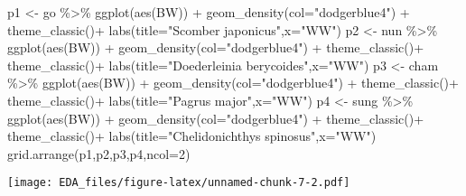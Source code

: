 \documentclass[
]{article}
\newenvironment{Shaded}{\begin{snugshade}}{\end{snugshade}}
\newcommand{\AttributeTok}[1]{\textcolor[rgb]{0.77,0.63,0.00}{#1}}
\newcommand{\DecValTok}[1]{\textcolor[rgb]{0.00,0.00,0.81}{#1}}
\newcommand{\FunctionTok}[1]{\textcolor[rgb]{0.00,0.00,0.00}{#1}}
\newcommand{\NormalTok}[1]{#1}
\newcommand{\OtherTok}[1]{\textcolor[rgb]{0.56,0.35,0.01}{#1}}
\newcommand{\SpecialCharTok}[1]{\textcolor[rgb]{0.00,0.00,0.00}{#1}}
\newcommand{\StringTok}[1]{\textcolor[rgb]{0.31,0.60,0.02}{#1}}
\begin{document}
\begin{Shaded}
\begin{Highlighting}[]
\NormalTok{p1 }\OtherTok{\textless{}{-}}\NormalTok{ go }\SpecialCharTok{\%\textgreater{}\%} \FunctionTok{ggplot}\NormalTok{(}\FunctionTok{aes}\NormalTok{(BW)) }\SpecialCharTok{+} \FunctionTok{geom\_density}\NormalTok{(}\AttributeTok{col=}\StringTok{"dodgerblue4"}\NormalTok{) }\SpecialCharTok{+} \FunctionTok{theme\_classic}\NormalTok{()}\SpecialCharTok{+} \FunctionTok{labs}\NormalTok{(}\AttributeTok{title=}\StringTok{"Scomber japonicus"}\NormalTok{,}\AttributeTok{x=}\StringTok{"WW"}\NormalTok{)}
\NormalTok{p2 }\OtherTok{\textless{}{-}}\NormalTok{ nun }\SpecialCharTok{\%\textgreater{}\%} \FunctionTok{ggplot}\NormalTok{(}\FunctionTok{aes}\NormalTok{(BW)) }\SpecialCharTok{+} \FunctionTok{geom\_density}\NormalTok{(}\AttributeTok{col=}\StringTok{"dodgerblue4"}\NormalTok{) }\SpecialCharTok{+} \FunctionTok{theme\_classic}\NormalTok{()}\SpecialCharTok{+} \FunctionTok{theme\_classic}\NormalTok{()}\SpecialCharTok{+} \FunctionTok{labs}\NormalTok{(}\AttributeTok{title=}\StringTok{"Doederleinia berycoides"}\NormalTok{,}\AttributeTok{x=}\StringTok{"WW"}\NormalTok{)}
\NormalTok{p3 }\OtherTok{\textless{}{-}}\NormalTok{ cham }\SpecialCharTok{\%\textgreater{}\%} \FunctionTok{ggplot}\NormalTok{(}\FunctionTok{aes}\NormalTok{(BW)) }\SpecialCharTok{+} \FunctionTok{geom\_density}\NormalTok{(}\AttributeTok{col=}\StringTok{"dodgerblue4"}\NormalTok{) }\SpecialCharTok{+} \FunctionTok{theme\_classic}\NormalTok{()}\SpecialCharTok{+} \FunctionTok{theme\_classic}\NormalTok{()}\SpecialCharTok{+} \FunctionTok{labs}\NormalTok{(}\AttributeTok{title=}\StringTok{"Pagrus major"}\NormalTok{,}\AttributeTok{x=}\StringTok{"WW"}\NormalTok{)}
\NormalTok{p4 }\OtherTok{\textless{}{-}}\NormalTok{ sung }\SpecialCharTok{\%\textgreater{}\%} \FunctionTok{ggplot}\NormalTok{(}\FunctionTok{aes}\NormalTok{(BW)) }\SpecialCharTok{+} \FunctionTok{geom\_density}\NormalTok{(}\AttributeTok{col=}\StringTok{"dodgerblue4"}\NormalTok{) }\SpecialCharTok{+} \FunctionTok{theme\_classic}\NormalTok{()}\SpecialCharTok{+} \FunctionTok{theme\_classic}\NormalTok{()}\SpecialCharTok{+} \FunctionTok{labs}\NormalTok{(}\AttributeTok{title=}\StringTok{"Chelidonichthys spinosus"}\NormalTok{,}\AttributeTok{x=}\StringTok{"WW"}\NormalTok{)}
\FunctionTok{grid.arrange}\NormalTok{(p1,p2,p3,p4,}\AttributeTok{ncol=}\DecValTok{2}\NormalTok{)}
\end{Highlighting}
\end{Shaded}

\texttt{[image: EDA\_files/figure-latex/unnamed-chunk-7-2.pdf]}
\end{document}
